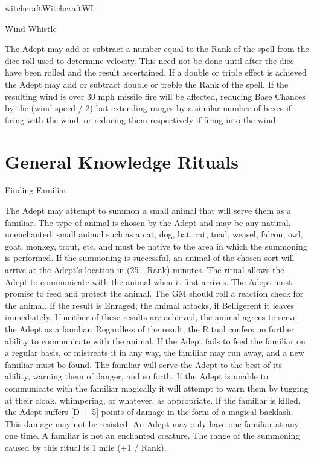 \begin{College}[1.1]{witchcraft}{Witchcraft}{WI}
\begin{spell}[G-13]{Wind Whistle}
\begin{effects}
The Adept may add or subtract a number equal to the Rank of the spell
from the dice roll used to determine velocity.  This need not be done
until after the dice have been rolled and the result ascertained.  If
a double or triple effect is achieved the Adept may add or subtract
double or treble the Rank of the spell.  If the resulting wind is over
30 mph missile fire will be affected, reducing Base Chances by the
(wind speed / 2) but extending ranges by a similar number of hexes if
firing with the wind, or reducing them respectively if firing into the
wind.
\end{effects}
\end{spell}

\section{General Knowledge Rituals}

\begin{ritual}[Q-1]{Finding Familiar}

\begin{effects}
The Adept may attempt to summon a small animal that will serve them as
a familiar. The type of animal is chosen by the Adept and may be any
natural, unenchanted, small animal such as a cat, dog, bat, rat, toad,
weasel, falcon, owl, goat, monkey, trout, etc, and must be native to
the area in which the summoning is performed.  If the summoning is
successful, an animal of the chosen sort will arrive at the Adept’s
location in (25 - Rank) minutes.  The ritual allows the Adept to
communicate with the animal when it first arrives.  The Adept must
promise to feed and protect the animal.  The GM should roll a reaction
check for the animal.  If the result is Enraged, the animal attacks,
if Belligerent it leaves immediately.  If neither of these results are
achieved, the animal agrees to serve the Adept as a familiar.
Regardless of the result, the Ritual confers no further ability to
communicate with the animal. If the Adept fails to feed the familiar
on a regular basis, or mistreats it in any way, the familiar may run
away, and a new familiar must be found.  The familiar will serve the
Adept to the best of its ability, warning them of danger, and so
forth.  If the Adept is unable to communicate with the familiar
magically it will attempt to warn them by tugging at their cloak,
whimpering, or whatever, as appropriate.  If the familiar is killed,
the Adept suffers [D + 5] points of damage in the form of a magical
backlash. This damage may not be resisted.  An Adept may only have one
familiar at any one time. A familiar is not an enchanted creature.
The range of the summoning caused by this ritual is 1 mile (+1 /
Rank).
\end{effects}
\end{ritual}


\end{College}
